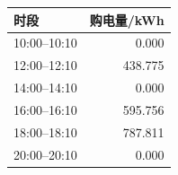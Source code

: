 \begin{tabular}{lr}
\toprule
时段 & 购电量/kWh \\
\midrule
10:00--10:10 & 0.000 \\
12:00--12:10 & 438.775 \\
14:00--14:10 & 0.000 \\
16:00--16:10 & 595.756 \\
18:00--18:10 & 787.811 \\
20:00--20:10 & 0.000 \\
\bottomrule
\end{tabular}
